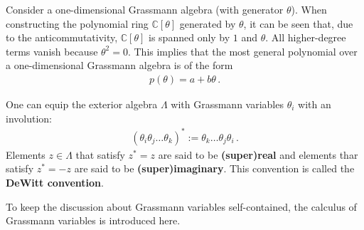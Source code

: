     \begin{property}[Polynomials]
        Consider a one-dimensional Grassmann algebra (with generator $\theta$). When constructing the polynomial ring $\mathbb{C}[\theta]$ generated by $\theta$, it can be seen that, due to the anticommutativity, $\mathbb{C}[\theta]$ is spanned only by $1$ and $\theta$. All higher-degree terms vanish because $\theta^2 = 0$. This implies that the most general polynomial over a one-dimensional Grassmann algebra is of the form
        \begin{gather}
            p(\theta) = a + b\theta\,.
        \end{gather}
    \end{property}

    \begin{definition}
        One can equip the exterior algebra $\Lambda$ with Grassmann variables $\theta_i$ with an involution:
        \begin{gather}
            (\theta_i\theta_j\ldots\theta_k)^* := \theta_k\ldots\theta_j\theta_i\,.
        \end{gather}
        Elements $z\in\Lambda$ that satisfy $z^*=z$ are said to be \textbf{(super)real} and elements thar satisfy $z^*=-z$ are said to be \textbf{(super)imaginary}. This convention is called the \textbf{DeWitt convention}.
    \end{definition}

    To keep the discussion about Grassmann variables self-contained, the calculus of Grassmann variables is introduced here.

